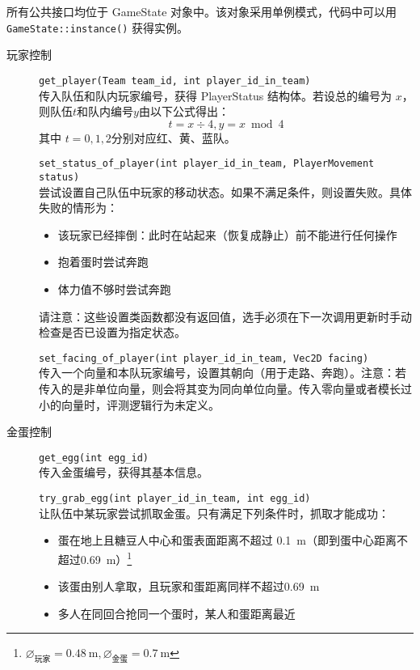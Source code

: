 \documentclass{article}
\begin{document}
所有公共接口均位于 GameState 对象中。该对象采用单例模式，代码中可以用 \lstinline{GameState::instance()} 获得实例。

\begin{description}
\item[玩家控制] \lstinline{get_player(Team team_id, int player_id_in_team)}\\[-2pt]
传入队伍和队内玩家编号，获得 PlayerStatus 结构体。若设总的编号为 $x$，则队伍$t$和队内编号$y$由以下公式得出：
\[t = x \div 4, y = x \bmod 4\]
其中 $t=0,1,2$分别对应红、黄、蓝队。

\lstinline{set_status_of_player(int player_id_in_team, PlayerMovement status)}\\[-2pt]
尝试设置自己队伍中玩家的移动状态。如果不满足条件，则设置失败。具体失败的情形为：
\begin{itemize}\setlength\itemsep{0em}
\item 该玩家已经摔倒：此时在站起来（恢复成静止）前不能进行任何操作
\item 抱着蛋时尝试奔跑
\item 体力值不够时尝试奔跑
\end{itemize}

请注意：这些设置类函数\color{red}都没有返回值\color{black}，选手必须在下一次调用更新时手动检查是否已设置为指定状态。

\lstinline{set_facing_of_player(int player_id_in_team, Vec2D facing)}\\[-2pt]
传入一个向量和本队玩家编号，设置其朝向（用于走路、奔跑）。注意：若传入的是非单位向量，则会将其变为同向单位向量。传入零向量或者模长过小的向量时，评测逻辑行为未定义。

\item[金蛋控制] \lstinline{get_egg(int egg_id)}\\[-2pt]
传入金蛋编号，获得其基本信息。

\lstinline{try_grab_egg(int player_id_in_team, int egg_id)}\\[-2pt]
让队伍中某玩家尝试抓取金蛋。只有满足下列条件时，抓取才能成功：

\begin{itemize}\setlength\itemsep{0em}
\item 蛋在地上且糖豆人中心和蛋表面距离不超过 \SI{0.1}{\meter}（即到蛋中心距离不超过\SI{0.69}{\meter}）\footnote{$\diameter_{\text{玩家}}=\SI{0.48}{\meter},\diameter_{\text{金蛋}}=\SI{0.7}{\meter}$}
\item 该蛋由别人拿取，且玩家和蛋距离同样不超过\SI{0.69}{\meter}
\item 多人在同回合抢同一个蛋时，某人和蛋距离最近
\end{itemize}


\end{description}
\end{document}
